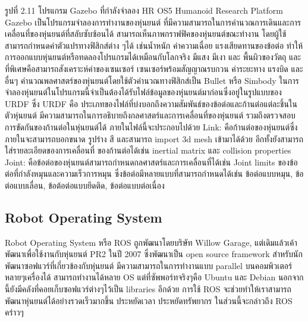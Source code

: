 รูปที่ 2.11 โปรแกรม Gazebo ที่กำลังจำลอง HR OS5 Humanoid Research Platform
Gazebo เป็นโปรแกรมจำลองการทำงานของหุ่นยนต์ ที่มีความสามารถในการคำนวณการเดินและการเคลื่อนที่ของหุ่นยนต์ที่สลับซับซ้อนได้ สามารถเห็นภาพกราฟฟิคของหุ่นยนต์ขณะทำงาน โดยผู้ใช้สามารถกำหนดค่าตัวแปรทางฟิสิกส์ต่าง ๆได้ เช่นน้ำหนัก ค่าความเฉื่อย แรงเสียดทานของข้อต่อ ทำให้การออกแบบหุ่นยนต์หรือทดลองโปรแกรมได้เหมือนกับโลกจริง มีแสง มีเงา และ พื้นผิวของวัตถุ และที่พิเศษคือสามารถสังเคราะห์ค่าของเซนเซอร์ เซนเซอร์พร้อมสัญญาณรบกวน ค่าระยะทาง แรงบิด และอื่นๆ คำนวณพลศาสตร์ของหุ่นยนต์โดยใช้ตัวคำนวณทางฟิสิกส์เป็น Bullet หรือ Simbody ในการจำลองหุ่นยนต์ในโปรแกรมนี้จำเป็นต้องได้รับไฟล์ข้อมูลของหุ่นยนต์มาก่อนซึ่งอยู่ในรูปแบบของ URDF ซึ่ง URDF คือ ประเภทของไฟล์ที่บ่งบอกถึงความสัมพันธ์ของข้อต่อและก้านต่อแต่ละชิ้นในตัวหุ่นยนต์ มีความสามารถในการอธิบายถึงกลศาสตร์และการเคลื่อนที่ของหุ่นยนต์ รวมถึงตรวจสอบการขัดกันของก้านต่อในหุ่นยนต์ได้ ภายในไฟล์นี้จะประกอบไปด้วย
Link: คือก้านต่อของหุ่นยนต์ซึ่งภายในจะสามารถบอกขนาด รูปร่าง สี และสามารถ import 3d mesh เข้ามาได้ด้วย อีกทั้งยังสามารถใส่รายละเอียดของการเคลื่อนที่ ของก้านต่อได้เช่น inertial matrix และ collision properties
Joint: คือข้อต่อของหุ่นยนต์สามารถกำหนดกลศาสตร์และการเคลื่อนที่ได้เช่น Joint limits ของข้อต่อที่กำลังหมุนและความเร็วการหมุน ซึ่งข้อต่อมีหลายแบบที่สามารถกำหนดได้เช่น ข้อต่อแบบหมุน, ข้อต่อแบบเลื่อน, ข้อต้อต่อแบบยึดติด, ข้อต่อแบบต่อเนื่อง

\clearpage
\subsection{Robot Operating System}
Robot Operating System หรือ ROS ถูกพัฒนาโดยบริษัท Willow Garage, แต่เดิมแล้วเค้าพัฒนาเพื่อใช้งานกับหุ่นยนต์ PR2 ในปี 2007
ซึ่งพัฒนาเป็น open source framework สำหรับนักพัฒนาซอฟแวร์ที่เกี่ยวข้องกับหุ่นยนต์ มีความสามารถในการทำงานแบบ parallel
บนคอมพิวเตอร์หลายๆเครื่องได้ สามารถทำงานได้หลาย OS แต่ที่ซัพพอร์ทจริงๆคือ Ubuntu และ Debian นอกจากนี้ยังมีคลังที่คอยเก็บซอฟแวร์ต่างๆไว้เป็น
libraries อีกด้วย การใช้ ROS จะช่วยทำให้เราสามารถพัฒนาหุ่นยนต์ได้อย่างรวดเร็วมากขึ้น ประหยัดเวลา ประหยัดทรัพยากร
ในส่วนนี้จะกล่าวถึง ROS คร่าวๆ


